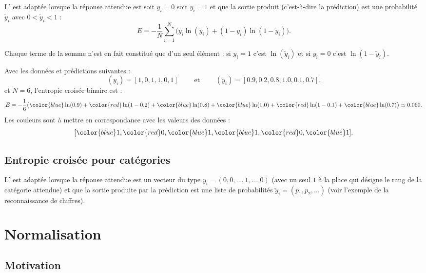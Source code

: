 \documentclass[11pt,class=report,crop=false]{standalone}
\begin{document}
L' est adaptée lorsque la réponse attendue est soit $y_i=0$ soit $y_i=1$ et que la sortie produit (c'est-à-dire la prédiction) est une probabilité $\widetilde y_i$ avec $0 < \widetilde y_i < 1$ :
$$E = -\frac{1}{N} \sum_{i=1}^N \big( y_i \ln(\widetilde y_i) + (1-y_i) \ln(1-\widetilde y_i)\big).$$
  
Chaque terme de la somme n'est en fait constitué que d'un seul élément : si
$y_i=1$ c'est  $\ln(\widetilde y_i)$ et si $y_i=0$ c'est $\ln(1-\widetilde y_i)$.

  
\begin{exemple}
Avec les données et prédictions suivantes :
$$(y_i) =  [1,0,1,1,0,1]
\qquad \text{ et } \qquad
(\widetilde y_i) = [0.9,0.2,0.8,1.0,0.1,0.7].
$$
et $N=6$, l'entropie croisée binaire est : 
$$E = -\frac{1}{6} \big( 
{\color{blue}\ln(0.9)} + {\color{red}\ln(1-0.2)} + {\color{blue}\ln(0.8)} + 
{\color{blue}\ln(1.0)} + {\color{red}\ln(1-0.1)} + {\color{blue}\ln(0.7)}
\big) \simeq 0.060.$$
Les couleurs sont à mettre en correspondance avec les valeurs des données :
$$[{\color{blue}1},{\color{red}0},{\color{blue}1},{\color{blue}1},{\color{red}0},{\color{blue}1}].$$
\end{exemple} 
    
    
\subsection{Entropie croisée pour catégories}

L' est adaptée lorsque la réponse attendue est un vecteur du type $y_i=(0,0,\ldots,1,\ldots,0)$ (avec un seul $1$ à la place qui désigne le rang de la catégorie attendue) et que la sortie produite par la prédiction est une liste de probabilités $\widetilde y_i = (p_1,p_2,\ldots)$ (voir l'exemple de la reconnaissance de chiffres).
 
 
 
\section{Normalisation}


\subsection{Motivation}
\end{document}
